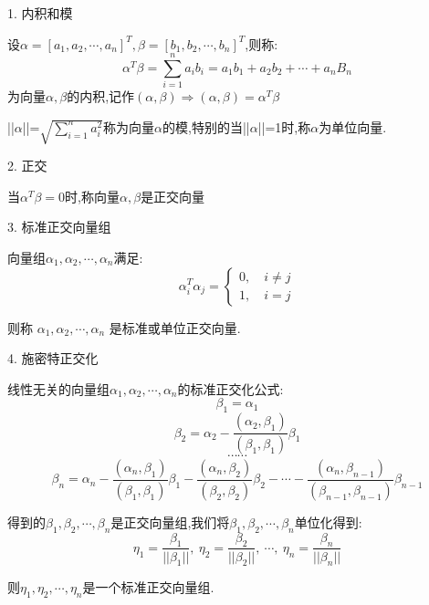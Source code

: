 \begin{definition}[向量的内积和正交]
	1. 内积和模
	
	设$\alpha=[a_{1},a_{2},\cdots,a_{n}]^{T},\beta=[b_{1},b_{2},\cdots,b_{n}]^{T}$,则称:  
	$$\alpha^{T}\beta=\sum\limits_{i=1}^{n}a_{i}b_{i}=a_{1}b_{1}+a_{2}b_{2}+\cdots+a_{n}B_{n}$$
	为向量\textbf{$\alpha,\beta$}的内积,记作$(\alpha,
	\beta)\Rightarrow (\alpha,
	\beta)=\alpha^{T}\beta$
	
	||$\alpha$||=$\sqrt{\sum\limits_{i=1}^{n}a_{i}^2}$称为向量$\alpha$的模,特别的当||$\alpha$||=1时,称$\alpha$为单位向量.
	
	2. 正交
	
	当$\alpha^{T}\beta=0$时,称向量$\alpha,\beta$是正交向量
	
	3. 标准正交向量组
	
	向量组$\alpha_{1},\alpha_{2},\cdots,\alpha_{n}$满足:  
	$$\alpha_{i}^{T}\alpha_{j}=\left\lbrace 
	\begin{array}{l}
		0,\quad i\neq j\\
		1,\quad i= j
	\end{array}
	\right. $$
	
	则称 $\alpha_{1},\alpha_{2},\cdots,\alpha_{n}$ 是标准或单位正交向量.
	
	4. 施密特正交化
	
	线性无关的向量组$\alpha_{1},\alpha_{2},\cdots,\alpha_{n}$的标准正交化公式:  
	$$\beta_{1}=\alpha_{1}$$
	$$\beta_{2}=\alpha_{2}-\frac{(\alpha_{2},\beta_{1})}{(\beta_{1},\beta_{1})}\beta_{1}$$
	$$\cdots\cdots$$
	$$\beta_{n}=\alpha_{n}-\frac{(\alpha_{n},\beta_{1})}{(\beta_{1},\beta_{1})}\beta_{1}-\frac{(\alpha_{n},\beta_{2})}{(\beta_{2},\beta_{2})}\beta_{2}-\cdots-\frac{(\alpha_{n},\beta_{n-1})}{(\beta_{n-1},\beta_{n-1})}\beta_{n-1}$$
	
	得到的$\beta_{1},\beta_{2},\cdots,\beta_{n}$是正交向量组,我们将$\beta_{1},\beta_{2},\cdots,\beta_{n}$单位化得到:  
	$$\eta_{1}=\frac{\beta_{1}}{||\beta_{1}||},\ \eta_{2}=\frac{\beta_{2}}{||\beta_{2}||},\ \cdots,\ \eta_{n}=\frac{\beta_{n}}{||\beta_{n}||}$$
	
	则$\eta_{1},\eta_{2},\cdots,\eta_{n}$是一个标准正交向量组.
\end{definition}
